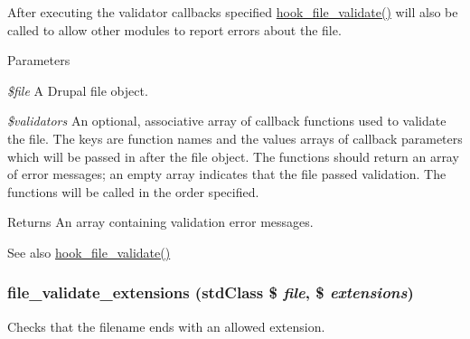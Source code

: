 After executing the validator callbacks specified \hyperlink{group__hooks_gab1491b52a117229913448d787156e013}{hook\_\-file\_\-validate()} will also be called to allow other modules to report errors about the file.


\begin{DoxyParams}{Parameters}
\item[{\em \$file}]A Drupal file object. \item[{\em \$validators}]An optional, associative array of callback functions used to validate the file. The keys are function names and the values arrays of callback parameters which will be passed in after the file object. The functions should return an array of error messages; an empty array indicates that the file passed validation. The functions will be called in the order specified.\end{DoxyParams}
\begin{DoxyReturn}{Returns}
An array containing validation error messages.
\end{DoxyReturn}
\begin{DoxySeeAlso}{See also}
\hyperlink{group__hooks_gab1491b52a117229913448d787156e013}{hook\_\-file\_\-validate()} 
\end{DoxySeeAlso}
\hypertarget{group__file_ga4036c6b78f904e5dd0273cf75eb474bb}{
\subsubsection[{file\_\-validate\_\-extensions}]{\setlength{\rightskip}{0pt plus 5cm}file\_\-validate\_\-extensions (stdClass \$ {\em file}, \/  \$ {\em extensions})}}
\label{group__file_ga4036c6b78f904e5dd0273cf75eb474bb}
Checks that the filename ends with an allowed extension.


